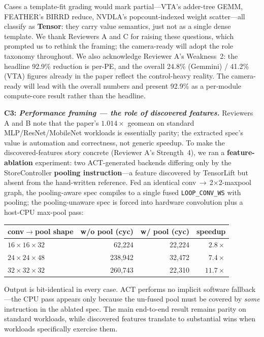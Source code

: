 \documentclass[sigconf, anonymous]{acmart}
\newcommand{\clabel}[1]{} %
\begin{document}
\noindent
Cases a template-fit grading would mark partial---VTA's adder-tree GEMM,
FEATHER's BIRRD reduce, NVDLA's popcount-indexed weight scatter---all
classify as \textbf{Tensor}: they carry value semantics, just not as a
single dense template. We thank Reviewers A and C for raising these
questions, which prompted us to rethink the framing; the camera-ready
will adopt the role taxonomy throughout. We also acknowledge Reviewer
A's Weakness~2:
the headline 92.9\% reduction is per-PE, and the overall 24.8\%
(Gemmini) / 41.2\% (VTA) figures already in the paper reflect the
control-heavy reality. The camera-ready will lead with the overall
numbers and present 92.9\% as a per-module compute-core result rather
than the headline.

\medskip
\noindent\textbf{C3: \emph{Performance framing --- the role of discovered features.}}\clabel{perf}
Reviewers A and B note that the paper's $1.014\times$ geomean on
standard MLP/ResNet/MobileNet workloads is essentially parity; the
extracted spec's value is automation and correctness, not generic
speedup. To make the discovered-features story concrete (Reviewer A's
Strength~4), we ran a \textbf{feature-ablation} experiment: two
ACT-generated backends differing only by the StoreController
\textbf{pooling instruction}---a feature discovered by TensorLift but
absent from the hand-written reference. Fed an identical
conv\,$\to$\,2$\times$2-maxpool graph, the
pooling-aware spec compiles to a single fused \texttt{LOOP\_CONV\_WS} with
pooling; the pooling-unaware spec is forced into hardware convolution plus
a host-CPU max-pool pass:

\smallskip
\noindent\begin{minipage}{\linewidth}\centering\scriptsize
\begin{tabular}{@{}lrrr@{}}
\toprule
conv$\to$pool shape & w/o pool (cyc) & w/ pool (cyc) & speedup \\
\midrule
$16{\times}16{\times}32$  &  62{,}224 & 22{,}224 & $2.8\times$  \\
$24{\times}24{\times}48$  & 238{,}942 & 32{,}472 & $7.4\times$  \\
$32{\times}32{\times}32$  & 260{,}743 & 22{,}310 & $11.7\times$ \\
\bottomrule
\end{tabular}
\end{minipage}
\smallskip

\noindent
Output is bit-identical in every case. ACT performs no implicit software
fallback---the CPU pass appears only because the un-fused pool must be
covered by \emph{some} instruction in the ablated spec. The main
end-to-end result remains parity on standard workloads, while discovered
features translate to substantial wins when workloads specifically
exercise them.
\end{document}
